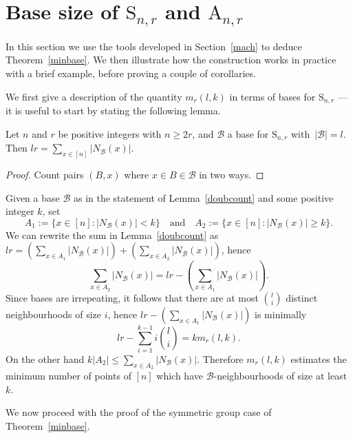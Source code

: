 \documentclass[ALCO,published]{cedram}
\renewcommand\S{\mathrm{S}}
\begin{document}
\section{Base size of \texorpdfstring{$\S_{n,r}$}{Snr} and \texorpdfstring{$\mathrm{A}_{n,r}$}{Anr}}\label{minb}

In this section we use the tools developed in Section~\ref{mach} to deduce Theorem~\ref{minbase}. We then illustrate how the construction works in practice with a brief example, before proving a couple of corollaries. 

We first give a description of the quantity $m_r(l,k)$ in terms of bases for $\S_{n,r}$ --- it is useful to start by stating the following lemma.

\begin{lemma}\label{doubcount}
Let $n$ and $r$ be positive integers with $n\geq 2r$, and $\mathcal{B}$ a base for $\S_{n,r}$ with~$|\mathcal{B}|=l$. Then $lr=\sum_{x\in [n]}|N_{\mathcal{B}}(x)|$.
\end{lemma}

\begin{proof}
Count pairs $(B,x)$ where $x\in B\in\mathcal{B}$ in two ways.
\end{proof}

Given a base $\mathcal{B}$ as in the statement of Lemma~\ref{doubcount} and some positive integer $k$, set $$A_1:=\{x\in [n] : |N_{\mathcal{B}}(x)|< k\} \quad\text{and}\quad A_2:=\{x\in [n] : |N_{\mathcal{B}}(x)|\geq k\}.$$ We can rewrite the sum in Lemma~\ref{doubcount} as $lr=\left(\sum_{x\in A_1}|N_{\mathcal{B}}(x)|\right)+\left(\sum_{x\in A_2}|N_{\mathcal{B}}(x)|\right)$, hence $$\sum_{x\in A_2}|N_{\mathcal{B}}(x)|=lr-\left(\sum_{x\in A_1}|N_{\mathcal{B}}(x)|\right).$$ Since bases are irrepeating, it follows that there are at most $\binom{l}{i}$ distinct neighbourhoods of size $i$, hence $lr-\left(\sum_{x\in A_1}|N_{\mathcal{B}}(x)|\right)$ is minimally $$lr-\sum_{i=1}^{k-1}i\binom{l}{i}=km_r(l,k).$$ On the other hand $k|A_2|\leq\sum_{x\in A_2}|N_{\mathcal{B}}(x)|$. Therefore $m_r(l,k)$ estimates the minimum number of points of $[n]$ which have $\mathcal{B}$-neighbourhoods of size at least $k$.

We now proceed with the proof of the symmetric group case of Theorem~\ref{minbase}.
\end{document}
